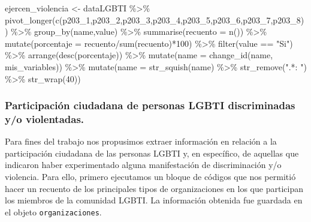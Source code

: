 \documentclass[
]{book}
\newenvironment{Shaded}{\begin{snugshade}}{\end{snugshade}}
\newcommand{\AttributeTok}[1]{\textcolor[rgb]{0.77,0.63,0.00}{#1}}
\newcommand{\DecValTok}[1]{\textcolor[rgb]{0.00,0.00,0.81}{#1}}
\newcommand{\FunctionTok}[1]{\textcolor[rgb]{0.00,0.00,0.00}{#1}}
\newcommand{\NormalTok}[1]{#1}
\newcommand{\OtherTok}[1]{\textcolor[rgb]{0.56,0.35,0.01}{#1}}
\newcommand{\SpecialCharTok}[1]{\textcolor[rgb]{0.00,0.00,0.00}{#1}}
\newcommand{\StringTok}[1]{\textcolor[rgb]{0.31,0.60,0.02}{#1}}
\theoremstyle{definition}
\theoremstyle{definition}
\theoremstyle{definition}
\theoremstyle{definition}
\theoremstyle{remark}
\begin{document}
\begin{Shaded}
\begin{Highlighting}[]
\NormalTok{ejercen\_violencia }\OtherTok{\textless{}{-}}\NormalTok{ dataLGBTI }\SpecialCharTok{\%\textgreater{}\%} 
  \FunctionTok{pivot\_longer}\NormalTok{(}\FunctionTok{c}\NormalTok{(p203\_1,p203\_2,p203\_3,p203\_4,p203\_5,p203\_6,p203\_7,p203\_8)) }\SpecialCharTok{\%\textgreater{}\%} 
  \FunctionTok{group\_by}\NormalTok{(name,value) }\SpecialCharTok{\%\textgreater{}\%} 
  \FunctionTok{summarise}\NormalTok{(}\AttributeTok{recuento =} \FunctionTok{n}\NormalTok{()) }\SpecialCharTok{\%\textgreater{}\%} 
  \FunctionTok{mutate}\NormalTok{(}\AttributeTok{porcentaje =}\NormalTok{ recuento}\SpecialCharTok{/}\FunctionTok{sum}\NormalTok{(recuento)}\SpecialCharTok{*}\DecValTok{100}\NormalTok{) }\SpecialCharTok{\%\textgreater{}\%} 
  \FunctionTok{filter}\NormalTok{(value }\SpecialCharTok{==} \StringTok{"Si"}\NormalTok{) }\SpecialCharTok{\%\textgreater{}\%} 
  \FunctionTok{arrange}\NormalTok{(}\FunctionTok{desc}\NormalTok{(porcentaje)) }\SpecialCharTok{\%\textgreater{}\%} 
  \FunctionTok{mutate}\NormalTok{(}\AttributeTok{name =} \FunctionTok{change\_id}\NormalTok{(name, mis\_variables)) }\SpecialCharTok{\%\textgreater{}\%} 
  \FunctionTok{mutate}\NormalTok{(}\AttributeTok{name =} \FunctionTok{str\_squish}\NormalTok{(name) }\SpecialCharTok{\%\textgreater{}\%} \FunctionTok{str\_remove}\NormalTok{(}\StringTok{".*: "}\NormalTok{) }\SpecialCharTok{\%\textgreater{}\%} \FunctionTok{str\_wrap}\NormalTok{(}\DecValTok{40}\NormalTok{))}
\end{Highlighting}
\end{Shaded}

\hypertarget{participaciuxf3n-ciudadana-de-personas-lgbti-discriminadas-yo-violentadas.}{%
\subsubsection{Participación ciudadana de personas LGBTI discriminadas y/o violentadas.}\label{participaciuxf3n-ciudadana-de-personas-lgbti-discriminadas-yo-violentadas.}}

Para fines del trabajo nos propusimos extraer información en relación a la participación ciudadana de las personas LGBTI y, en específico, de aquellas que indicaron haber experimentado alguna manifestación de discriminación y/o violencia. Para ello, primero ejecutamos un bloque de códigos que nos permitió hacer un recuento de los principales tipos de organizaciones en los que participan los miembros de la comunidad LGBTI. La información obtenida fue guardada en el objeto \texttt{organizaciones}.
\end{document}
